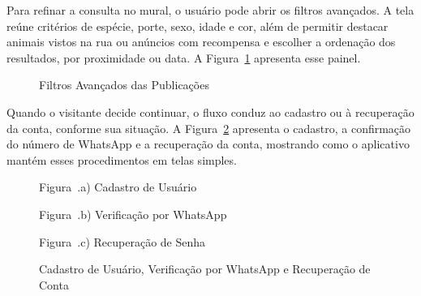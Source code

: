 Para refinar a consulta no mural, o usuário pode abrir os filtros avançados. A tela reúne critérios de espécie, porte, sexo, idade e cor, além de permitir destacar animais vistos na rua ou anúncios com recompensa e escolher a ordenação dos resultados, por proximidade ou data. A Figura~\ref{fig:tela_filtros_avancados} apresenta esse painel.

\begin{figure}[H]
    \centering
    \caption{Filtros Avançados das Publicações}
    \label{fig:tela_filtros_avancados}
\end{figure}

Quando o visitante decide continuar, o fluxo conduz ao cadastro ou à recuperação da conta, conforme sua situação. A Figura~\ref{fig:tela_cadastro_recuperacao} apresenta o cadastro, a confirmação do número de WhatsApp e a recuperação da conta, mostrando como o aplicativo mantém esses procedimentos em telas simples.

\begin{figure}[H]
    \centering
    \caption{Cadastro de Usuário, Verificação por WhatsApp e Recuperação de Conta}
    \label{fig:tela_cadastro_recuperacao}
    \vspace{0.15cm}
    \begin{minipage}[t]{0.31\textwidth}
        \centering
        \par\vspace{0.15cm}
        {\small Figura~\thefigure.a) Cadastro de Usuário}
    \end{minipage}
    \hfill
    \begin{minipage}[t]{0.31\textwidth}
        \centering
        \par\vspace{0.15cm}
        {\small Figura~\thefigure.b) Verificação por WhatsApp}
    \end{minipage}
    \hfill
    \begin{minipage}[t]{0.31\textwidth}
        \centering
        \par\vspace{0.15cm}
        {\small Figura~\thefigure.c) Recuperação de Senha}
    \end{minipage}
    \par\vspace{0.12cm}
\end{figure}

